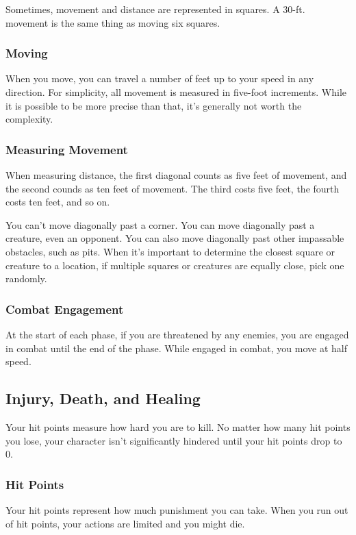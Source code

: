 Sometimes, movement and distance are represented in squares. A 30-ft. movement is the same thing as moving six squares.

\subsubsection{Moving}

When you move, you can travel a number of feet up to your speed in any direction. For simplicity, all movement is measured in five-foot increments. While it is possible to be more precise than that, it's generally not worth the complexity.

\subsubsection{Measuring Movement}

 When measuring distance, the first diagonal counts as five feet of movement, and the second counds as ten feet of movement. The third costs five feet, the fourth costs ten feet, and so on.

You can't move diagonally past a corner. You can move diagonally past a creature, even an opponent. You can also move diagonally past other impassable obstacles, such as pits.
 When it's important to determine the closest square or creature to a location, if multiple squares or creatures are equally close, pick one randomly.


\subsubsection{Combat Engagement}

At the start of each phase, if you are threatened by any enemies, you are engaged in combat until the end of the phase. While engaged in combat, you move at half speed.
\subsection{Injury, Death, and Healing}\label{Injury, Death, and Healing}
Your hit points measure how hard you are to kill. No matter how many hit points you lose, your character isn't significantly hindered until your hit points drop to 0.

\subsubsection{Hit Points}\label{Hit Points}
Your hit points represent how much punishment you can take. When you run out of hit points, your actions are limited and you might die.

